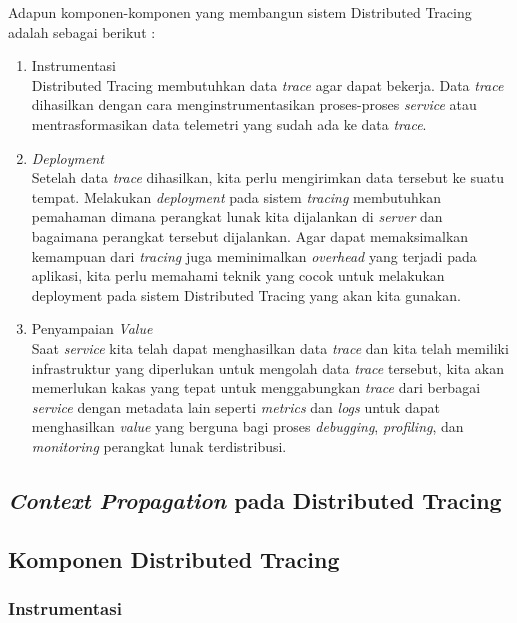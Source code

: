 Adapun komponen-komponen yang membangun sistem Distributed Tracing adalah sebagai berikut \citep{parker2020distributed}:
\begin{enumerate}
      \item Instrumentasi \\
            Distributed Tracing membutuhkan data \textit{trace} agar dapat bekerja.
            Data \textit{trace} dihasilkan dengan cara menginstrumentasikan proses-proses \textit{service} atau mentrasformasikan data telemetri yang sudah ada ke data \textit{trace}.
      \item \textit{Deployment} \\
            Setelah data \textit{trace} dihasilkan, kita perlu mengirimkan data tersebut ke suatu tempat.
            Melakukan \textit{deployment} pada sistem \textit{tracing} membutuhkan pemahaman dimana perangkat lunak kita dijalankan di \textit{server} dan bagaimana perangkat tersebut dijalankan.
            Agar dapat memaksimalkan kemampuan dari \textit{tracing} juga meminimalkan \textit{overhead} yang terjadi pada aplikasi, kita perlu memahami teknik yang cocok untuk melakukan deployment pada sistem Distributed Tracing yang akan kita gunakan.
      \item Penyampaian \textit{Value} \\
            Saat \textit{service} kita telah dapat menghasilkan data \textit{trace} dan kita telah memiliki infrastruktur yang diperlukan untuk mengolah data \textit{trace} tersebut, kita akan memerlukan kakas yang tepat untuk menggabungkan \textit{trace} dari berbagai \textit{service} dengan metadata lain seperti \textit{metrics} dan \textit{logs} untuk dapat menghasilkan \textit{value} yang berguna bagi proses \textit{debugging}, \textit{profiling}, dan \textit{monitoring} perangkat lunak terdistribusi.
\end{enumerate}

\subsection{\textit{Context Propagation} pada Distributed Tracing}

\subsection{Komponen Distributed Tracing}

\subsubsection{Instrumentasi}

